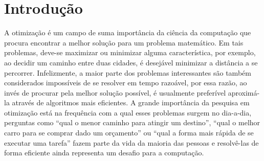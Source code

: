 \chapter[Introdução]{Introdução}

A otimização é um campo de suma importância da ciência da computação que procura encontrar a melhor solução para um problema matemático. Em tais problemas, deve-se maximizar ou minimizar alguma característica, por exemplo, ao decidir um caminho entre duas cidades, é desejável minimizar a distância a se percorrer. Infelizmente, a maior parte dos problemas interessantes são também considerados impossíveis de se resolver em tempo razoável, por essa razão, ao invés de procurar pela melhor solução possível, é usualmente preferível aproximá-la através de algoritmos mais eficientes. A grande importância da pesquisa em otimização está na frequência com a qual esses problemas surgem no dia-a-dia, perguntas como ``qual o menor caminho para atingir um destino'', ``qual o melhor carro para se comprar dado um orçamento'' ou ``qual a forma mais rápida de se executar uma tarefa'' fazem parte da vida da maioria das pessoas e resolvê-las de forma eficiente ainda representa um desafio para a computação.

